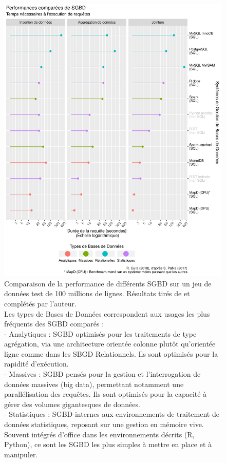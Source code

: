 \begin{figure}[H]
	\centering
	\includegraphics[width=\linewidth]{img/benchmark_results.pdf}
	\captionsetup{width=.95\linewidth}
	\caption[Comparaison de la performance de différents SGBD sur un jeu de données test de 100 millions de lignes.]{Comparaison de la performance de différents SGBD sur un jeu de données test de 100 millions de lignes. 
		Résultats tirés de \textcite{pafka_benchm-databases_2017} et complétés par l'auteur.\\
		Les \og types de Bases de Données\fg{} correspondent aux usages les plus fréquents des SGBD comparés :\\
		- Analytiques : SGBD optimisés pour les traitements de type agrégation, via une architecture orientée colonne plutôt qu'orientée ligne comme dans les SBGD Relationnels. Ils sont optimisés pour la rapidité d'exécution.\\
		- Massives : SGBD pensés pour la gestion et l'interrogation de données massives (big data), permettant notamment une parallélisation des requêtes. Ils sont optimisés pour la capacité à gérer des volumes gigantesques de données.\\
		- Statistiques : SGBD internes aux environnements de traitement de données statistiques, reposant sur une gestion en mémoire vive.
		Souvent intégrés d'office dans les environnements décrits (R, Python), ce sont les SGBD les plus simples à mettre en place et à manipuler.
	}
	\label{fig:db-benchmarks}
\end{figure}

